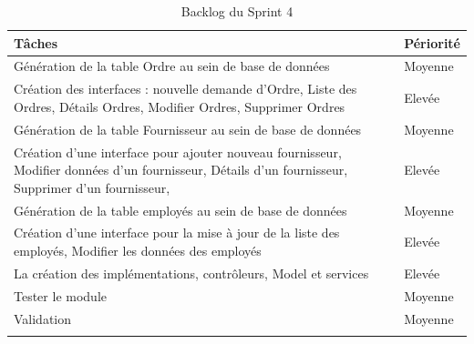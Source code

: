         \begin{longtable}{|m{9cm}|m{4cm}|}
                
                \hline 
                    \textbf{Tâches} & \textbf{Périorité}\\
                \hline
                \endhead
                 \endfoot
                  \endlastfoot
                \hline  
                    Génération de la table Ordre au sein de base de données 
                    & Moyenne\\
            
                \hline
                    Création des interfaces : nouvelle demande d’Ordre, Liste des Ordres, Détails Ordres, Modifier Ordres, Supprimer Ordres
                    & Elevée\\
            
                \hline
                    Génération de la table Fournisseur au sein de base de données
                    & Moyenne\\
                    
                    
                \hline
                    Création d’une interface pour ajouter nouveau fournisseur, Modifier données d’un fournisseur, Détails d’un fournisseur, Supprimer d’un fournisseur, 
                    & Elevée\\
                
                \hline  
                    Génération de la table employés au sein de base de données 
                    & Moyenne\\
            
                \hline
                    Création d’une interface pour la mise à jour de la liste des employés, Modifier les données des employés 
                    & Elevée\\
                    
                \hline
                    La création des implémentations, contrôleurs, Model et services
                    & Elevée\\

                \hline
                    Tester le module
                    & Moyenne\\

                \hline
                    Validation
                    & Moyenne\\
                    

                \hline
            
                 
              \captionsetup{justification=centering,margin=2cm}
              \caption{Backlog du Sprint 4}

            \end{longtable}
    
